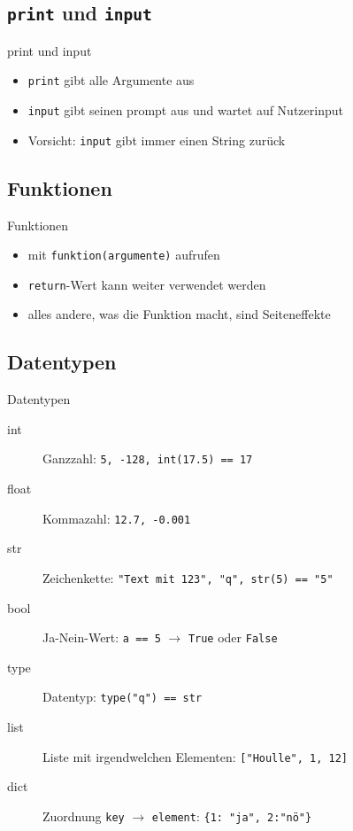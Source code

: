 \subsection{\texttt{print} und \texttt{input}}
\begin{frame}{print und input}
	
	\begin{itemize}
		\item \texttt{print} gibt alle Argumente aus
		\item \texttt{input} gibt seinen prompt aus und wartet auf Nutzerinput
		\item Vorsicht: \texttt{input} gibt immer einen String zurück
	\end{itemize}
\end{frame}

\subsection{Funktionen}
\begin{frame}{Funktionen}
	
	\begin{itemize}
		\item mit \texttt{funktion(argumente)} aufrufen
		\item \texttt{return}-Wert kann weiter verwendet werden
		\item alles andere, was die Funktion macht, sind Seiteneffekte
	\end{itemize}
\end{frame}

\subsection{Datentypen}
\begin{frame}{Datentypen}
	\begin{description}
		\item[int] Ganzzahl: \texttt{5, -128, int(17.5) == 17}
		\item[float] Kommazahl: \texttt{12.7, -0.001}
		\item[str] Zeichenkette: \texttt{"Text mit 123", "q", str(5) == "5"}
		\item[bool] Ja-Nein-Wert: \texttt{a == 5} $\to$ \texttt{True} oder \texttt{False}
		\item[type] Datentyp: \texttt{type("q") == str}
		\item[list] Liste mit irgendwelchen Elementen: \texttt{["Houlle", 1, 12]}
		\item[dict] Zuordnung \texttt{key} $\to$ \texttt{element}: \texttt{\{1: "ja", 2:"nö"\}}
	\end{description}
	
\end{frame}


